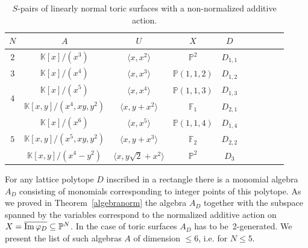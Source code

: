 \documentclass[a4paper,draft,reqno,12pt]{amsart}
\theoremstyle{definition}
\theoremstyle{definition}
\theoremstyle{remark}
\def\Im{{\rm Im}\,}
\def\BK{{\mathbb K}}
\def\BF{{\mathbb F}}
\def\BK{{\mathbb K}}
\def\BP{{\mathbb P}}
\begin{document}
\begin{table}[h]
\begin{tabular}{ |Sc|Sc|Sc|Sc|Sc| } 
\hline
$N$  & $A$ & $U$ & $X$ & $D$\\
\hline
{} &  $\BK[x]/(x^3)$ & $\langle x,x^{2}\rangle$ & $\BP^2$ & $D_{1,1}$ \\
\hline
{} &  $\BK[x]/(x^4)$ & $\langle x,x^{3}\rangle$ & $\BP(1,1,2)$ & $D_{1,2}$ \\
\hline
{} & $ \BK[x]/(x^5)$ & $\langle x,x^4\rangle$ & $\BP(1,1,3)$ & $D_{1,3}$  \\ 
&  $\BK[x,y]/(x^4,xy,y^2)$ & $\langle x, y+x^2\rangle$ & $\BF_1$ & $D_{2,1}$\\ 
\hline
{} & $\BK[x]/(x^6)$ & $\langle x,x^5\rangle$ & $\BP(1,1,4)$ & $D_{1,4}$\\
&  $\BK[x,y]/(x^5,xy,y^2)$ & $\langle x, y+x^3\rangle$ & $\BF_2$ & $D_{2,2}$ \\
&  $\BK[x,y]/(x^4-y^2)$ & $\langle x, y\sqrt{2}+x^2\rangle$ & $\BP^2$ & $D_3$ \\
\hline
\end{tabular}
\caption{
    $S$-pairs of linearly normal toric surfaces with a non-normalized additive action.}
\end{table}

For any lattice polytope $D$ inscribed in a rectangle there is a monomial algebra $A_D$ consisting of monomials corresponding to integer points of this polytope. As we proved in Theorem~\ref{algebranorm} the algebra $A_D$ together with the subspace spanned by the variables correspond to the normalized additive action on $X = \overline{\Im\varphi_D}\subseteq\BP^N$. In the case of toric surfaces $A_D$ has to be~2-generated. We present the list of such algebras $A$ of dimension $\leq6$, i.e. for $N\leq5$.
\end{document}

